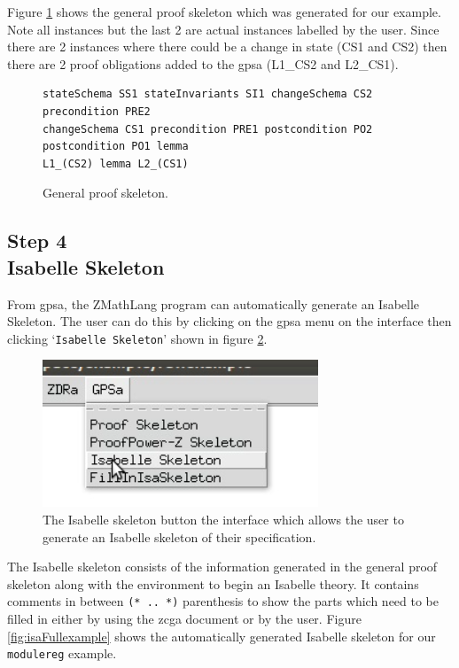 Figure \ref{fig:gpsaFullexample} shows the general proof skeleton which was
generated for our example. Note all instances but the last 2 are actual
instances labelled by the user. Since there are 2 instances where there could be
a change in state (CS1 and CS2) then there are 2 proof obligations added to the
\gls{gpsa} (L1\_CS2 and L2\_CS1).

\begin{figure}[H]
\centering
\begin{scriptsize}
\begin{BVerbatim}
stateSchema SS1 stateInvariants SI1 changeSchema CS2 precondition PRE2
changeSchema CS1 precondition PRE1 postcondition PO2 postcondition PO1 lemma
L1_(CS2) lemma L2_(CS1) 
\end{BVerbatim}
\end{scriptsize}
\caption{General proof skeleton. \label{fig:gpsaFullexample}}
\end{figure}

\subsection{Step 4\\Isabelle Skeleton}

From \gls{gpsa}, the ZMathLang program can automatically generate an Isabelle
Skeleton. The user can do this by clicking on the \gls{gpsa} menu on the
interface then clicking `\texttt{Isabelle Skeleton}' shown in figure
\ref{fig:isabutton}.

\begin{figure}[H]
\centering
\includegraphics[scale=0.45]{Figures/fullexample/isabelskeleton.png}
\caption{The Isabelle skeleton button the interface which allows the user to generate an Isabelle skeleton of their specification. \label{fig:isabutton}}
\end{figure}

 The Isabelle skeleton consists of the information generated in the general
 proof skeleton along with the environment to begin an Isabelle theory. It
 contains comments in between \verb|(* .. *)| parenthesis to show the parts which
 need to be filled in either by using the \gls{zcga} document or by the user.
 Figure \ref{fig:isaFullexample} shows the automatically generated Isabelle
 skeleton for our \texttt{modulereg} example.

